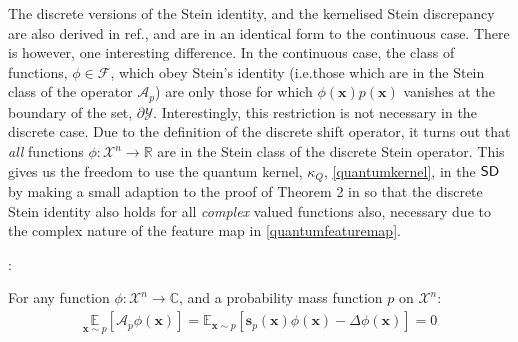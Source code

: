 The discrete versions of the Stein identity, and the kernelised Stein discrepancy are also derived in ref., and are in an identical form to the continuous case. There is however, one interesting difference. In the continuous case, the class of functions, $\phi \in \mathcal{F}$, which obey Stein's identity (i.e.\@ those which are in the Stein class of the operator $\mathcal{A}_p$) are only those for which $\phi(\mathbf{x})p(\mathbf{x})$ vanishes at the boundary of the set, $\partial \mathcal{Y}$. Interestingly, this restriction is not necessary in the discrete case. Due to the definition of the discrete shift operator, it turns out that \textit{all} functions $\phi: \mathcal{X}^n \rightarrow \mathbb{R}$ are in the Stein class of the discrete Stein operator. This gives us the freedom to use the quantum kernel, $\kappa_Q$, \eqref{quantumkernel}, in the $\operatorname{\textsf{SD}}$ by making a small adaption to the proof of Theorem 2 in  so that the discrete Stein identity also holds for all \textit{complex} valued functions also, necessary due to the complex nature of the feature map in \eqref{quantumfeaturemap}.
\begin{theorem}\label{thm:complexdiscretesteinidentity}:

For any function $\phi: \mathcal{X}^n\rightarrow \mathbb{C}$, and a probability mass function $p$ on $\mathcal{X}^n$:
\begin{align}
    \underset{\mathbf{x}\sim p}{\mathbb{E}}[\mathcal{A}_p \phi(\mathbf{x})]= \mathbb{E}_{\mathbf{x} \sim p}\left[\mathbf{s}_p(\mathbf{x})\phi(\mathbf{x}) - \Delta \phi(\mathbf{x})\right] = 0 
    \label{complexdiscretesteinidentity_supp}
\end{align}
\end{theorem}

